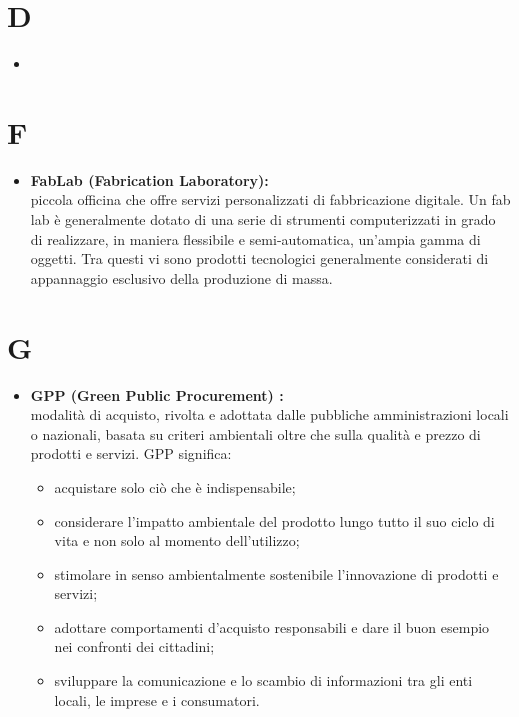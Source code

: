\documentclass[11pt]{book}              %
\begin{document}
\section*{D}
\begin{itemize}

\item 
\end{itemize}

\section*{F}
\begin{itemize}

\item \textbf{{\color{Plum} FabLab} (Fabrication Laboratory):} \\
piccola officina che offre servizi personalizzati di fabbricazione digitale.
Un fab lab è generalmente dotato di una serie di strumenti computerizzati in grado di realizzare, in maniera flessibile e semi-automatica, un'ampia gamma di oggetti. Tra questi vi sono prodotti tecnologici generalmente considerati di appannaggio esclusivo della produzione di massa.

\end{itemize}

\section*{G}
\begin{itemize}

	\item \textbf{{\color{OliveGreen}GPP} (Green Public Procurement) :} \\
	modalità di acquisto, rivolta e adottata dalle pubbliche amministrazioni locali o nazionali, basata su criteri ambientali oltre che sulla qualità e prezzo di prodotti e servizi. 
	GPP significa:
	\begin{itemize}
		\item acquistare solo ciò che è indispensabile;
	 	\item considerare l’impatto ambientale del prodotto lungo tutto il suo ciclo di vita e non solo al momento dell’utilizzo;
    		\item stimolare in senso ambientalmente sostenibile l’innovazione di prodotti e servizi;
    		\item adottare comportamenti d’acquisto responsabili e dare il buon esempio nei confronti dei cittadini;
    		\item sviluppare la comunicazione e lo scambio di informazioni tra gli enti locali, le imprese e i consumatori.
	\end{itemize}

\end{itemize}
\end{document}
